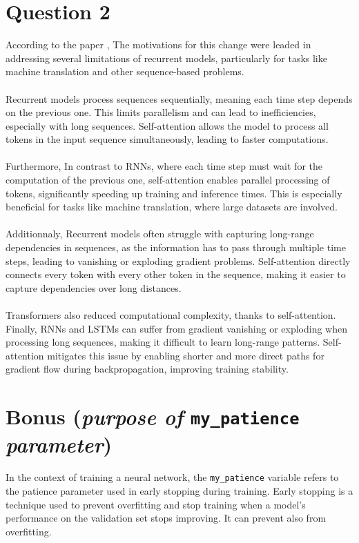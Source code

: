 \documentclass[a4paper]{article}
\begin{document}
\section{Question 2}
\noindent
According to the paper \cite{vaswani2023attentionneed}, The motivations for this
change were leaded in addressing several limitations of recurrent models, particularly for
tasks like machine translation and other sequence-based problems.
\\
\\
\noindent
Recurrent models process sequences sequentially, meaning each time step depends on the previous
one. This limits parallelism and can lead to inefficiencies, especially with long sequences.
Self-attention allows the model to process all tokens in the input sequence simultaneously,
leading to faster computations.
\\
\\
\noindent
Furthermore, In contrast to RNNs, where each time step must wait for the computation
of the previous one, self-attention enables parallel processing of tokens, significantly
speeding up training and inference times. This is especially beneficial for tasks like
machine translation, where large datasets are involved.
\\
\\
\noindent
Additionnaly, Recurrent models often struggle with capturing long-range
dependencies in sequences, as the information has to pass through multiple
time steps, leading to vanishing or exploding gradient problems. Self-attention
directly connects every token with every other token in the sequence, making it easier
to capture dependencies over long distances.
\\
\\
\noindent
Transformers also reduced computational complexity, thanks to self-attention. Finally,
RNNs and LSTMs can suffer from gradient vanishing or exploding when processing long sequences,
making it difficult to learn long-range patterns. Self-attention mitigates this issue by
enabling shorter and more direct paths for gradient flow during backpropagation, improving
training stability.


\section{Bonus (\textit{purpose of} \texttt{my\_patience} \textit{parameter})}
\noindent
In the context of training a neural network, the \texttt{my\_patience} variable refers to
the patience parameter used in early stopping during training. Early stopping is a
technique used to prevent overfitting and stop training when a model’s performance on
the validation set stops improving. It can prevent also from overfitting.
\end{document}

